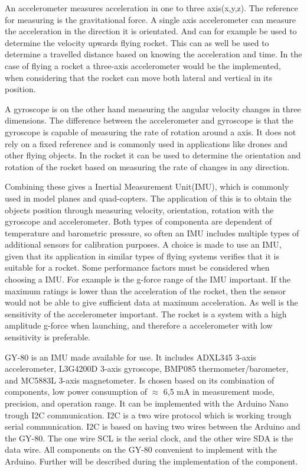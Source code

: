 An accelerometer measures acceleration in one to three axis(x,y,z). The reference for measuring is the gravitational force. A single axis accelerometer can measure the acceleration in the direction it is orientated. And can for example be used to determine the velocity upwards flying rocket. This can as well be used to determine a travelled distance based on knowing the acceleration and time. In the case of flying a rocket a three-axis accelerometer would be the implemented, when considering that the rocket can move both lateral and vertical in its position.  


A gyroscope is on the other hand measuring the angular velocity changes in three dimensions. The difference between the accelerometer and gyroscope is that the gyroscope is capable of measuring the rate of rotation around a axis. It does not rely on a fixed reference and is commonly used in applications like drones and other flying objects. In the rocket it can be used to determine the orientation and rotation of the rocket based on measuring the rate of changes in any direction.  


Combining these gives a Inertial Measurement Unit(IMU), which is commonly used in model planes and quad-copters. The application of this is to obtain the objects position through measuring velocity, orientation, rotation with the gyroscope and accelerometer. Both types of componenta are dependent of temperature and barometric pressure, so often an IMU includes multiple types of additional sensors for calibration purposes. A choice is made to use an IMU, given that its application in similar types of flying systems verifies that it is suitable for a rocket.    	  
Some performance factors must be considered when choosing a IMU. For example is the g-force range of the IMU important. If the maximum ratings is lower than the acceleration of the rocket, then the sensor would not be able to give sufficient data at maximum acceleration. As well is the sensitivity of the accelerometer important. The rocket is a system with a high amplitude g-force when launching, and therefore a accelerometer with low sensitivity is preferable.

GY-80\cite{web:GY80} is an IMU made available for use. It includes ADXL345 3-axis accelerometer, L3G4200D 3-axis gyroscope, BMP085 thermometer/barometer, and MC5883L 3-axis magnetometer. Is chosen based on its combination of components, low power consumption of $\approx$ 6,5 mA in measurement mode, precision, and operation range. It can be implemented with the Arduino Nano trough I2C communication.
I2C is a two wire protocol which is working trough serial communication. I2C is based on having two wires between the Arduino and the GY-80. The one wire SCL is the serial clock, and the other wire SDA is the data wire. All components on the GY-80 convenient to implement with the Arduino. Further will be described during the implementation of the component.

